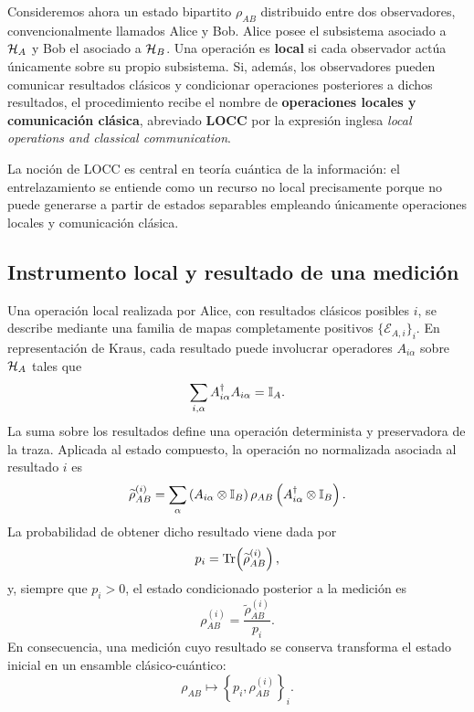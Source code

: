 \documentclass[../main.tex]{subfiles}
\begin{document}
Consideremos ahora un estado bipartito $\rho_{AB}$ distribuido entre dos observadores, convencionalmente llamados Alice y Bob. Alice posee el subsistema asociado a $\mathcal{H}_A$ y Bob el asociado a $\mathcal{H}_B$. Una operación es \textbf{local} si cada observador actúa únicamente sobre su propio subsistema. Si, además, los observadores pueden comunicar resultados clásicos y condicionar operaciones posteriores a dichos resultados, el procedimiento recibe el nombre de \textbf{operaciones locales y comunicación clásica}, abreviado \textbf{LOCC} por la expresión inglesa \emph{local operations and classical communication}.

La noción de LOCC es central en teoría cuántica de la información: el entrelazamiento se entiende como un recurso no local precisamente porque no puede generarse a partir de estados separables empleando únicamente operaciones locales y comunicación clásica.

\subsection*{Instrumento local y resultado de una medición}

Una operación local realizada por Alice, con resultados clásicos posibles $i$, se describe mediante una familia de mapas completamente positivos $\{\mathcal{E}_{A,i}\}_i$. En representación de Kraus, cada resultado puede involucrar operadores $A_{i\alpha}$ sobre $\mathcal{H}_A$ tales que
\begin{equation*}
    \sum_{i,\alpha} A_{i\alpha}^{\dagger}A_{i\alpha}=\mathbb{I}_A.
\end{equation*}
La suma sobre los resultados define una operación determinista y preservadora de la traza. Aplicada al estado compuesto, la operación no normalizada asociada al resultado $i$ es
\begin{equation*}
    \widetilde{\rho}_{AB}^{(i)}
    =\sum_\alpha
    \left(A_{i\alpha}\otimes\mathbb{I}_B\right)
    \rho_{AB}
    \left(A_{i\alpha}^{\dagger}\otimes\mathbb{I}_B\right).
\end{equation*}
La probabilidad de obtener dicho resultado viene dada por
\begin{equation*}
    p_i=\Tr\!\left(\widetilde{\rho}_{AB}^{(i)}\right),
\end{equation*}
y, siempre que $p_i>0$, el estado condicionado posterior a la medición es
\begin{equation*}
    \rho_{AB}^{(i)}
    =\frac{\widetilde{\rho}_{AB}^{(i)}}{p_i}.
\end{equation*}
En consecuencia, una medición cuyo resultado se conserva transforma el estado inicial en un ensamble clásico-cuántico:
\begin{equation*}
    \rho_{AB}
    \longmapsto
    \left\{p_i,\rho_{AB}^{(i)}\right\}_i.
\end{equation*}
\end{document}
